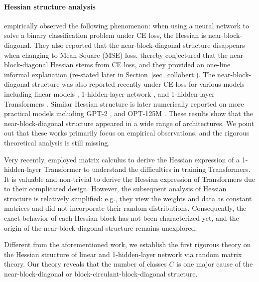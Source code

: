\documentclass{article}
\newcommand{\1}{^{(1)}}
\newcommand{\2}{^{(2)}}
\begin{document}
\paragraph{Hessian structure analysis} 
 \citet{collobert2004large} empirically observed the following phenomenon: 
when using a neural network to solve a binary classification problem under CE loss, the Hessian is near-block-diagonal. 
They also reported that the near-block-diagonal structure disappears when changing to Mean-Square (MSE) loss. 
\citet{collobert2004large} thereby conjectured that the near-block-diagonal Hessian stems from CE loss, and they provided an one-line informal explanation (re-stated later in Section~\ref{sec_collobert}). The near-block-diagonal structure was also reported recently under CE loss for various models including linear models  \citep{kunstner2024heavy}, 1-hidden-layer network \citep{zhang2024transformers}, and 1-hidden-layer Transformers \citep{zhang2024adam}. Similar Hessian structure is later numerically reported on more practical models including  GPT-2 \citep{maes2024understanding}, and OPT-125M \citep{malinovskii2024pushing}. 
These results show that the near-block-diagonal structure
appeared in a wide range of architectures. 
We point out that these works primarily focus on empirical observations, and the rigorous theoretical analysis is still missing.

Very recently, \citet{ormaniec2024does} employed matrix calculus to derive the  Hessian expression of a 1-hidden-layer Transformer to understand the difficulties in training Transformers. It is valuable and non-trivial to derive the Hessian expression of Transformers due to their complicated design. However, the subsequent analysis of Hessian structure is relatively simplified: e.g.,  they view the weights and data as constant matrices and did not incorporate their random distributions.  Consequently, the exact behavior of each Hessian block has not been characterized yet, and the origin of the near-block-diagonal structure remains unexplored. 








Different from the aforementioned work, we establish the first rigorous theory on the Hessian structure of linear and 1-hidden-layer network via random matrix theory.  Our theory reveals that the number of classes $C$ is one major cause of the near-block-diagonal or block-circulant-block-diagonal structure. 
\end{document}
